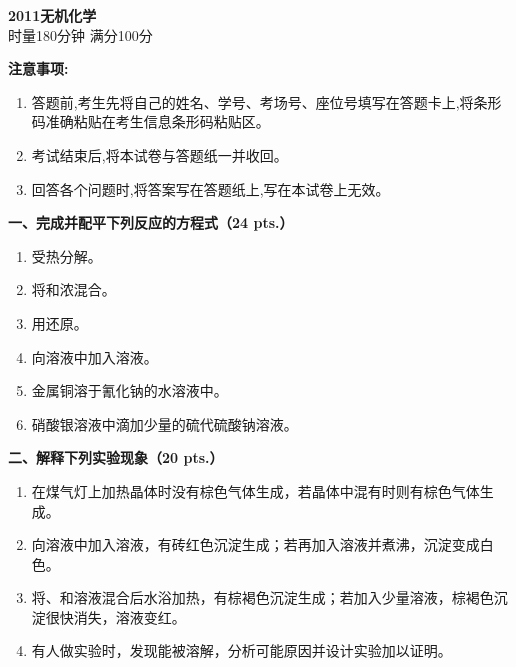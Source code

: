 \begin{center}
    {\LARGE \textbf{2011无机化学}} \\[2ex]
    {\large 时量180分钟 \quad 满分100分}
\end{center}

\vspace{0.5cm}
\noindent\textbf{注意事项:}
\begin{enumerate}[label=\arabic*., parsep=0pt, itemsep=0pt]
    \item 答题前,考生先将自己的姓名、学号、考场号、座位号填写在答题卡上,将条形码准确粘贴在考生信息条形码粘贴区。
    \item 考试结束后,将本试卷与答题纸一并收回。
    \item 回答各个问题时,将答案写在答题纸上,写在本试卷上无效。
\end{enumerate}

\vspace{0.5cm}
\noindent\textbf{一、完成并配平下列反应的方程式（24 pts.）}

\begin{enumerate}[label=\arabic*., start=1, itemsep=1.5ex]
    \item {}受热分解。
    \item 将和浓混合。
    \item 用还原。
    \item 向溶液中加入溶液。
    \item 金属铜溶于氰化钠的水溶液中。
    \item 硝酸银溶液中滴加少量的硫代硫酸钠溶液。
\end{enumerate}

\vspace{0.5cm}
\noindent\textbf{二、解释下列实验现象（20 pts.）}

\begin{enumerate}[label=\arabic*., start=1, itemsep=1.5ex]
    \item 在煤气灯上加热晶体时没有棕色气体生成，若晶体中混有时则有棕色气体生成。
    \item 向溶液中加入溶液，有砖红色沉淀生成；若再加入溶液并煮沸，沉淀变成白色。
    \item 将、和溶液混合后水浴加热，有棕褐色沉淀生成；若加入少量溶液，棕褐色沉淀很快消失，溶液变红。
    \item 有人做实验时，发现能被溶解，分析可能原因并设计实验加以证明。
\end{enumerate}

